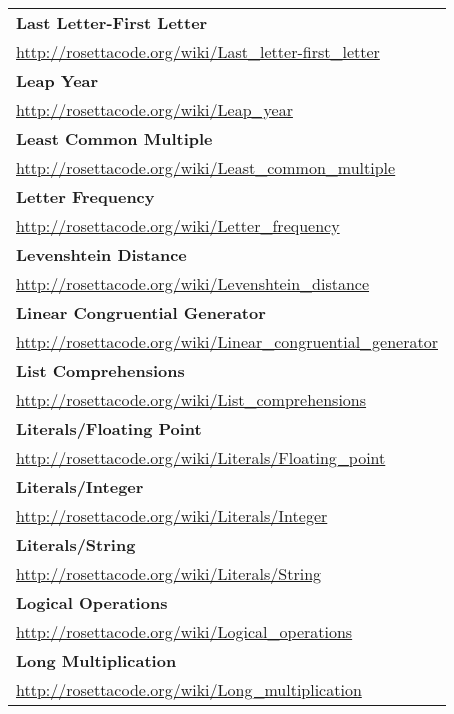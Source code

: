 \begin{longtable}{l}
\textbf{Last Letter-First Letter } \\ \href{http://rosettacode.org/wiki/Last\_letter-first\_letter}{http://rosettacode.org/wiki/Last\_letter-first\_letter} \\
\textbf{
Leap Year } \\ \href{http://rosettacode.org/wiki/Leap\_year}{http://rosettacode.org/wiki/Leap\_year} \\
\textbf{Least Common Multiple } \\ \href{http://rosettacode.org/wiki/Least\_common\_multiple}{http://rosettacode.org/wiki/Least\_common\_multiple} \\
\textbf{Letter Frequency } \\ \href{http://rosettacode.org/wiki/Letter\_frequency}{http://rosettacode.org/wiki/Letter\_frequency} \\
\textbf{
Levenshtein Distance } \\ \href{http://rosettacode.org/wiki/Levenshtein\_distance}{http://rosettacode.org/wiki/Levenshtein\_distance} \\
\textbf{Linear Congruential Generator } \\ \href{http://rosettacode.org/wiki/Linear\_congruential\_generator}{http://rosettacode.org/wiki/Linear\_congruential\_generator} \\
\textbf{
List Comprehensions } \\ \href{http://rosettacode.org/wiki/List\_comprehensions}{http://rosettacode.org/wiki/List\_comprehensions} \\
\textbf{Literals/Floating Point } \\ \href{http://rosettacode.org/wiki/Literals/Floating\_point}{http://rosettacode.org/wiki/Literals/Floating\_point} \\
\textbf{Literals/Integer } \\ \href{http://rosettacode.org/wiki/Literals/Integer}{http://rosettacode.org/wiki/Literals/Integer} \\
\textbf{
Literals/String } \\ \href{http://rosettacode.org/wiki/Literals/String}{http://rosettacode.org/wiki/Literals/String} \\
\textbf{Logical Operations } \\ \href{http://rosettacode.org/wiki/Logical\_operations}{http://rosettacode.org/wiki/Logical\_operations} \\
\textbf{Long Multiplication } \\ \href{http://rosettacode.org/wiki/Long\_multiplication}{http://rosettacode.org/wiki/Long\_multiplication} \\

\end{longtable}
